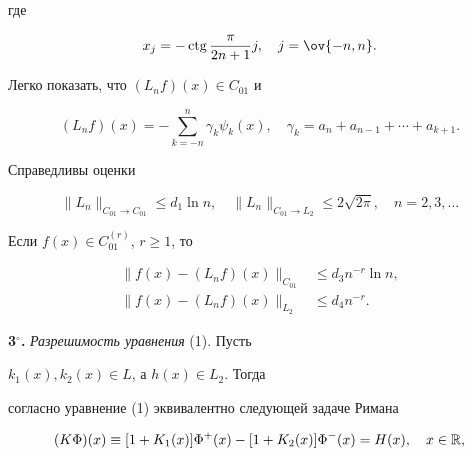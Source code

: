 где 


\begin{equation} 


x_j=-\ctg\frac{\pi}{2n+1}j,\quad j=\ov{-n,n}. 


\end{equation} 


Легко показать, что $(L_n f)(x)\in C_{01}$ и 


$$ 


(L_n f)(x)=-\sum^n_{k=-n}\gamma_k\psi_k(x),\quad 


\gamma_k=a_n+a_{n-1}+\dotsb+a_{k+1}. 


$$ 


 


\begin{thm} 


Справедливы оценки 


$$ 


\|L_n\|_{C_{01}\to C_{01}}\le d_1\ln n,\quad 


\|L_n\|_{C_{01}\to L_2}\le 2\sqrt{2\pi},\quad n=2,3,\dotsc 


$$ 


\end{thm} 


 


\begin{thm} 


Если $f(x)\in C^{(r)}_{01}$, $r\ge 1$, то 


\begin{align*} 


\|f(x)-(L_n f)(x)\|_{C_{01}}&\le d_3n^{-r}\ln n,\\ 


\|f(x)-(L_n f)(x)\|_{L_2}&\le d_4n^{-r}. 


\end{align*} 


\end{thm} 


 


{\bf 3${}^\circ$.} {\it Разрешимость уравнения} (1). Пусть 


$k_1(x),k_2(x)\in L$, а $h(x)\in L_2$. Тогда 


согласно \cite{6} уравнение (1) эквивалентно следующей задаче Римана 


\begin{equation} 


(K\Phi)(x)\equiv[1+K_1(x)]\Phi^+(x)- 


[1+K_2(x)]\Phi^-(x)=H(x),\quad x\in \Bbb R, 


\end{equation} 


